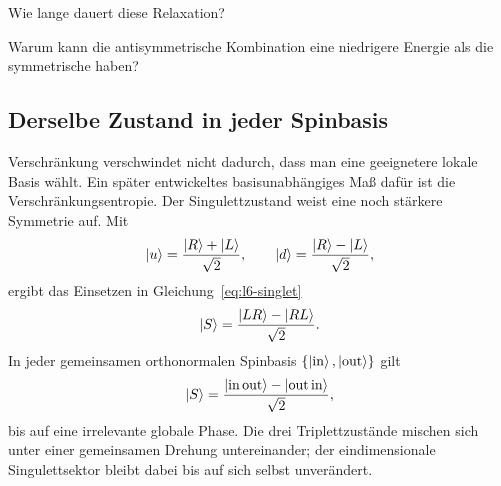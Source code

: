 \begin{classroomqa}Wie lange dauert diese Relaxation?\audiencequestion{
}
\end{classroomqa}

\begin{classroomqa}Warum kann die antisymmetrische Kombination eine niedrigere Energie als die symmetrische haben?\audiencequestion{
}
\end{classroomqa}

\subsection{Derselbe Zustand in jeder Spinbasis}

Verschränkung verschwindet nicht dadurch, dass man eine geeignetere lokale Basis wählt. Ein später entwickeltes basisunabhängiges Maß dafür ist die Verschränkungsentropie. Der Singulettzustand weist eine noch stärkere Symmetrie auf. Mit
\begin{equation}
\left\lvert u\right\rangle=\frac{\left\lvert R\right\rangle+\left\lvert L\right\rangle}{\sqrt2},
\qquad
\left\lvert d\right\rangle=\frac{\left\lvert R\right\rangle-\left\lvert L\right\rangle}{\sqrt2},
\end{equation}
ergibt das Einsetzen in Gleichung~\eqref{eq:l6-singlet}
\begin{equation}
\left\lvert S\right\rangle
=\frac{\left\lvert LR\right\rangle-\left\lvert RL\right\rangle}{\sqrt2}.
\label{eq:l6-singlet-x-basis}
\end{equation}
In jeder gemeinsamen orthonormalen Spinbasis \(\{\left\lvert\rm in\right\rangle,\left\lvert\rm out\right\rangle\}\) gilt
\begin{equation}
\left\lvert S\right\rangle
=\frac{\left\lvert{\rm in}\,{\rm out}\right\rangle-\left\lvert{\rm out}\,{\rm in}\right\rangle}{\sqrt2},
\label{eq:l6-singlet-any-basis}
\end{equation}
bis auf eine irrelevante globale Phase. Die drei Triplettzustände mischen sich unter einer gemeinsamen Drehung untereinander; der eindimensionale Singulettsektor bleibt dabei bis auf sich selbst unverändert.

